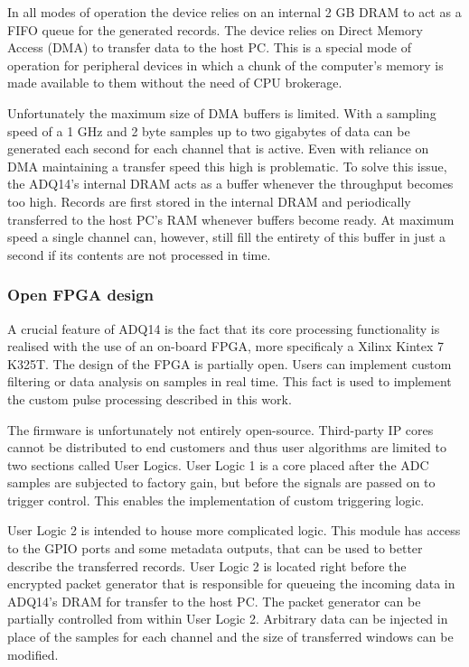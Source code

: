 In all modes of operation the device relies on an internal 2 GB DRAM
to act as a FIFO queue for the generated records.
The device relies on Direct Memory Access (DMA) to transfer
data to the host PC. This is a special mode of operation for 
peripheral devices in which a chunk of the computer's memory is
made available to them without the need of CPU brokerage.


Unfortunately the maximum size of DMA buffers is limited. 
With a sampling speed of a 1 GHz and 2 byte samples up 
to two gigabytes of data can be generated each second for each
channel that is active. Even with reliance on DMA maintaining 
a transfer speed this high is problematic. To solve this issue, 
the ADQ14's internal DRAM acts as a buffer 
whenever the throughput becomes too high.
Records are first stored in the internal DRAM and periodically
transferred to the host PC's RAM whenever buffers become ready.
At maximum speed a single channel can, however, still fill the entirety
of this buffer in just a second if its contents are not processed in time.

\subsubsection{Open FPGA design} \label{ssec:adq_devkit}

A crucial feature of ADQ14 is the fact that its core processing
functionality is realised with the use of an on-board FPGA,
more specificaly a Xilinx Kintex 7 K325T. The design of the FPGA
is partially open. Users can implement custom
filtering or data analysis on samples in real time.
This fact is used to implement the custom pulse processing described in this work.


The firmware is unfortunately not entirely open-source.
Third-party IP cores cannot be distributed to end customers 
and thus user algorithms are limited to two sections called User Logics.
User Logic 1 is a core placed after the ADC samples are subjected to factory
gain, but before the signals are passed on to trigger control.
This enables the implementation of custom triggering logic.


User Logic 2 is intended to house more complicated logic.
This module has access to the GPIO ports and some metadata
outputs, that can be used to better describe the transferred records.
User Logic 2 is located right before the encrypted packet generator
that is responsible for queueing the incoming data in ADQ14's DRAM 
for transfer to the host PC. The packet generator can be partially
controlled from within User Logic 2. Arbitrary data can be injected
in place of the samples for each channel and the size of transferred windows 
can be modified.

